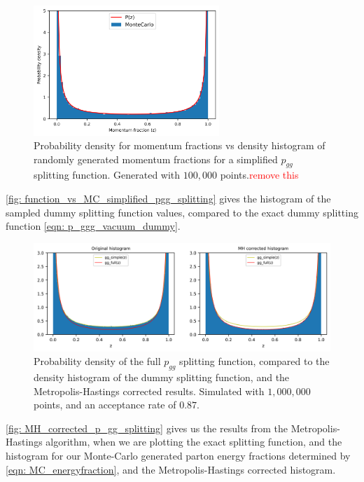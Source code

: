 \documentclass[main.tex]{subfiles}
\begin{document}
\begin{figure}[h]
    \centering
    \includegraphics[width=7cm]{pictures/MH_plots/p_ggg_simple_MCvsPZ.png}
    \caption{Probability density for momentum fractions vs density histogram of randomly generated momentum fractions for a simplified \(p_{gg}\) splitting function. Generated with \(100,000\) points.\textcolor{red}{remove this}}
    \label{fig: function_vs_MC_simplified_pgg_splitting}
\end{figure}
\autoref{fig: function_vs_MC_simplified_pgg_splitting} gives the histogram of the sampled dummy splitting function values, compared to the exact dummy splitting function \autoref{eqn: p_ggg_vacuum_dummy}. 

\begin{figure}[h]
    \centering
    \includegraphics[width=14cm]{pictures/MH_plots/MH_vacuum_gg.png}
    \caption{Probability density of the full \(p_{gg}\) splitting function, compared to the density histogram of the dummy splitting function, and the Metropolis-Hastings corrected results. Simulated with \(1,000,000\) points, and an acceptance rate of \(0.87\).}
    \label{fig: MH_corrected_p_gg_splitting}
\end{figure}
\autoref{fig: MH_corrected_p_gg_splitting} gives us the results from the Metropolis-Hastings algorithm, when we are plotting the exact splitting function, and the histogram for our Monte-Carlo generated parton energy fractions determined by \autoref{eqn: MC_energyfraction}, and the Metropolis-Hastings corrected histogram.
\end{document}
